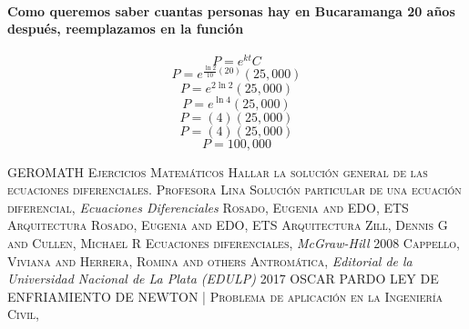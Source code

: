 \documentclass{article}
\begin{document}
\paragraph{Como queremos saber cuantas personas hay en Bucaramanga 20 años después, reemplazamos en la función } 
\begin{equation}
P=e^{kt}C
\end{equation}
\begin{equation}
P=e^{\frac{\ln{2}}{10}(20)}(25,000)
\end{equation}
\begin{equation}
P=e^{2\ln{2}}(25,000)
\end{equation}
\begin{equation}
P=e^{\ln{4}}(25,000)
\end{equation}
\begin{equation}
P=(4)(25,000)
\end{equation}
\begin{equation}
P=(4)(25,000)
\end{equation}
\begin{equation}
P=100,000
\end{equation}
\begin{thebibliography}{X}
 \textsc{GEROMATH Ejercicios Matemáticos} \textsc{Hallar la solución general de las ecuaciones diferenciales.}
 \textsc{Profesora Lina}  \textsc{Solución particular de una ecuación diferencial},
\textit{Ecuaciones Diferenciales}
 \textsc{Rosado, Eugenia and EDO, ETS Arquitectura}  \textsc{Rosado, Eugenia and EDO, ETS Arquitectura}
 \textsc{Zill, Dennis G and Cullen, Michael R}  \textsc{Ecuaciones diferenciales},
\textit{McGraw-Hill} 2008
 \textsc{Cappello, Viviana and Herrera, Romina and others}  \textsc{Antrom{\'a}tica},
\textit{Editorial de la Universidad Nacional de La Plata (EDULP)} 2017
 \textsc{OSCAR PARDO}  \textsc{LEY DE ENFRIAMIENTO DE NEWTON | Problema de aplicación en la Ingeniería Civil},
\end{thebibliography}
\end{document}
